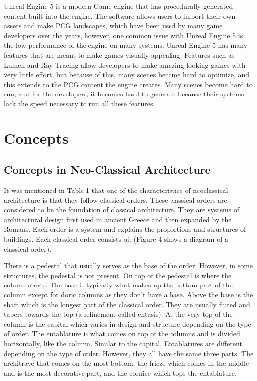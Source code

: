 \documentclass[manuscript,screen,12pt]{article}
\begin{document}
Unreal Engine 5 is a modern Game engine that has procedurally generated content built into the engine. The software allows users to import their own assets and make PCG landscapes, which have been used by many game developers over the years, however, one common issue with Unreal Engine 5 is the low performance of the engine on many systems. Unreal Engine 5 has many features that are meant to make games visually appealing. Features such as Lumen and Ray Tracing allow developers to make amazing-looking games with very little effort, but because of this, many scenes become hard to optimize, and this extends to the PCG content the engine creates. Many scenes become hard to run, and for the developers, it becomes hard to generate because their systems lack the speed necessary to run all these features.

\newpage
\section{Concepts}

\subsection{Concepts in Neo-Classical Architecture}
It was mentioned in Table 1 that one of the characteristics of neoclassical architecture is that they follow classical orders. These classical orders are considered to be the foundation of classical architecture. They are systems of architectural design first used in ancient Greece and then expanded by the Romans. Each order is a system and explains the proportions and structures of buildings. Each classical order consists of: (Figure 4 shows a diagram of a classical order).

There is a pedestal that usually serves as the base of the order. However, in some structures, the pedestal is not present. On top of the pedestal is where the column starts. The base is typically what makes up the bottom part of the column except for doric columns as they don’t have a base. Above the base is the shaft which is the longest part of the classical order. They are usually fluted and tapers towards the top (a refinement called entasis). At the very top of the column is the capital which varies in design and structure depending on the type of order. The entablature is what comes on top of the columns and is divided horizontally, like the column. Similar to the capital, Entablatures are different depending on the type of order. However, they all have the same three parts. The architrave that comes on the most bottom, the frieze which comes in the middle and is the most decorative part, and the cornice which tops the entablature. 
\end{document}
